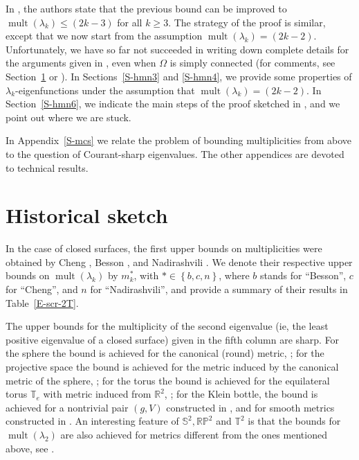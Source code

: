 \documentclass[12pt,a4paper]{amsart}
\theoremstyle{plain} %
\theoremstyle{definition}
\numberwithin{equation}{section}
\numberwithin{figure}{section}
\numberwithin{table}{section}
\newcommand{\R}{\mathbb{R}}
\newcommand{\bS}{\mathbb{S}}
\newcommand{\T}{\mathbb{T}}
\DeclareMathOperator{\mult}{mult}
\newcommand{\set}[1]{\left\lbrace #1 \right\rbrace}
\begin{document}
In \cite[Theorem~B, p.~1172]{HoMN1999}, the authors state that the previous bound can be improved to $\mult(\lambda_k) \le (2k-3)$ for all $k\ge 3$. The strategy of the proof is similar, except that we now start from the assumption $\mult(\lambda_k) = (2k-2)$. Unfortunately, we have so far not succeeded in writing down complete details for the arguments given in \cite{HoMN1999}, even when $\Omega$ is simply connected (for comments, see Section~\ref{S-sketch} or \cite[Section~4]{Berd2018}). In Sections~\ref{S-hmn3} and \ref{S-hmn4}, we provide some properties of $\lambda_k$-eigenfunctions under the assumption that $\mult(\lambda_k) = (2k-2)$. In Section~\ref{S-hmn6}, we indicate the main steps of the proof sketched in \cite[Section~3]{HoMN1999}, and we point out where we are stuck.\smallskip

In Appendix~\ref{S-mcs} we relate the problem of bounding multiplicities from above to the question of Courant-sharp eigenvalues. The other appendices are devoted to technical results.


\section{Historical sketch}\label{S-sketch}



In the case of closed surfaces, the first upper bounds on multiplicities were obtained by  Cheng \cite{Chen1976}, Besson \cite{Bess1980}, and Nadirashvili \cite{Nadi1987}.
We denote their respective upper bounds on $\mult(\lambda_k)$ by $m_k^{*}$, with $* \in \set{b,c,n}$, where $b$ stands for ``Besson'', $c$ for ``Cheng'', and $n$ for ``Nadirashvili'', and provide a summary of their results in
Table~\ref{E-scr-2T}. \smallskip

The upper bounds for the multiplicity of the second eigenvalue (ie, the least positive eigenvalue of a closed surface) given in the fifth column are sharp. For the sphere the bound is achieved for the canonical (round) metric, \cite{Chen1976}; for the projective space the bound is achieved for the metric induced by the canonical metric of the sphere, \cite{Bess1980}; for the torus the bound is achieved for the equilateral torus $\T_e$ with metric induced from $\R^2$, \cite{Bess1980}; for the Klein bottle, the bound is achieved for a nontrivial pair $(g,V)$ constructed in \cite[\S\,2]{Nadi1987}, and for smooth metrics constructed in \cite[Th\'{e}or\`{e}me~4.2]{ColV1987}. An interesting feature of $\bS^2, \mathbb{RP}^2$ and $\T^2$ is that the bounds for $\mult(\lambda_2)$ are also achieved for metrics different from the ones mentioned above, see \cite{Bess1980}.\smallskip
\end{document}
